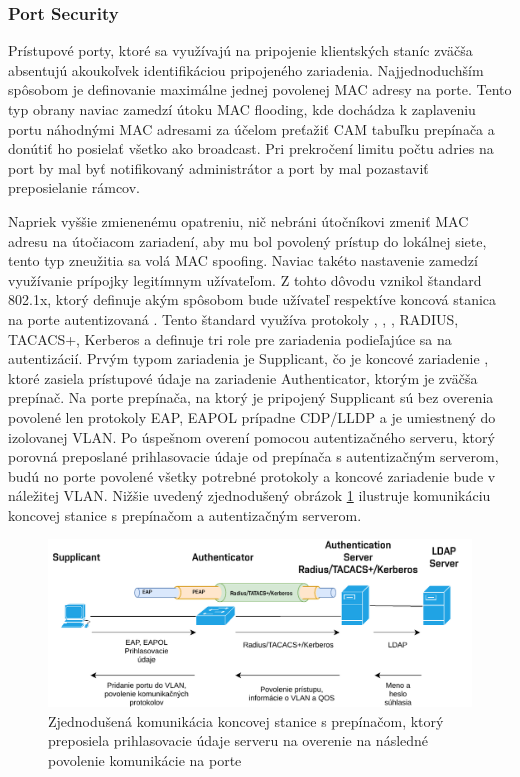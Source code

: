 \subsubsection*{Port Security}
Prístupové porty, ktoré sa využívajú na pripojenie klientských staníc zväčša absentujú akoukoľvek identifikáciou pripojeného zariadenia. Najjednoduchším spôsobom je definovanie maximálne jednej povolenej MAC adresy na porte. Tento typ obrany naviac zamedzí útoku MAC flooding, kde dochádza k zaplaveniu portu náhodnými MAC adresami za účelom preťažiť CAM tabuľku prepínača a donútiť ho posielať všetko ako broadcast. Pri prekročení limitu počtu adries na port by mal byť notifikovaný administrátor a port by mal pozastaviť preposielanie rámcov.

Napriek vyššie zmienenému opatreniu, nič nebráni útočníkovi zmeniť MAC adresu na útočiacom zariadení, aby mu bol povolený prístup do lokálnej siete, tento typ zneužitia sa volá MAC spoofing. Naviac takéto nastavenie zamedzí využívanie prípojky legitímnym užívateľom. Z tohto dôvodu vznikol štandard 802.1x, ktorý definuje akým spôsobom bude užívateľ respektíve koncová stanica na porte autentizovaná \cite{Vyncke2008}. Tento štandard využíva protokoly , , , RADIUS, TACACS+, Kerberos a definuje tri role pre zariadenia podieľajúce sa na autentizácií. Prvým typom zariadenia je Supplicant, čo je koncové zariadenie , ktoré zasiela prístupové údaje na zariadenie Authenticator, ktorým je zväčša prepínač. Na porte prepínača, na ktorý je pripojený Supplicant sú bez overenia povolené len protokoly EAP, EAPOL prípadne CDP/LLDP a je umiestnený do izolovanej VLAN. Po úspešnom overení pomocou autentizačného serveru, ktorý porovná preposlané prihlasovacie údaje od prepínača s autentizačným serverom, budú no porte povolené všetky potrebné protokoly a koncové zariadenie bude v náležitej VLAN. Nižšie uvedený zjednodušený obrázok \ref{fig:dot1x} ilustruje komunikáciu koncovej stanice s prepínačom a autentizačným serverom.  

\begin{figure}[H]
	\begin{center}
		\includegraphics[scale=0.75]{obrazky/dot1x.pdf}
	\end{center}
	\caption[Autentizácia 802.1x zjednodušene]{Zjednodušená komunikácia koncovej stanice s prepínačom, ktorý preposiela prihlasovacie údaje serveru na overenie na následné povolenie komunikácie na porte \cite{Vyncke2008}}
	\label{fig:dot1x}
\end{figure}


